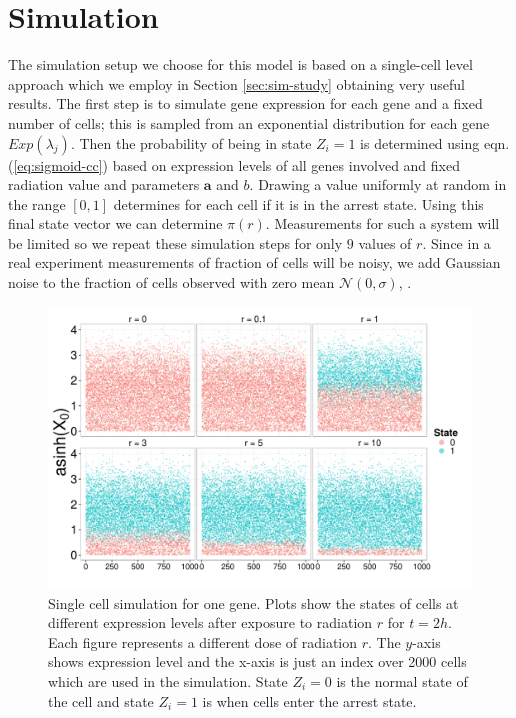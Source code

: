 \section{Simulation}
\label{sec:simulation}

The simulation setup we choose for this model is based on a single-cell level approach which we employ in Section \ref{sec:sim-study} obtaining very useful results. The first step is to simulate gene expression for each gene and a fixed number of cells; this is sampled from an exponential distribution for each gene $Exp(\lambda_j)$. Then the probability of being in state $Z_i = 1$  is determined using eqn. (\ref{eq:sigmoid-cc}) based on expression levels of all genes involved and fixed radiation value and parameters  $\mathbf{a}$ and $b$. Drawing a value uniformly at random in the range $[0, 1]$ determines for each cell if it is in the arrest state. Using this final state vector we can determine $\pi(r)$. Measurements for such a system will be limited so we repeat these simulation steps for only $9$ values of $r$. Since in a real experiment measurements of fraction of cells will be noisy, we add Gaussian noise to the fraction of cells observed with zero mean $\mathcal{N}(0, \sigma)$, .

\begin{figure}[!t]
  \centering
  \includegraphics[width=1\textwidth]{pics/cell-cycle-sim1.pdf}
  \caption{Single cell simulation for one gene. Plots show the states of cells at different expression levels after exposure to radiation $r$ for $t=2h$. Each figure represents a different dose of radiation $r$. The $y$-axis shows expression level and the x-axis is just an index over 2000 cells which are used in the simulation. State $Z_i = 0$ is the normal state of the cell and state $Z_i =1$ is when cells enter the arrest state. }
  \label{fig:rad-single-gene}
\end{figure}

